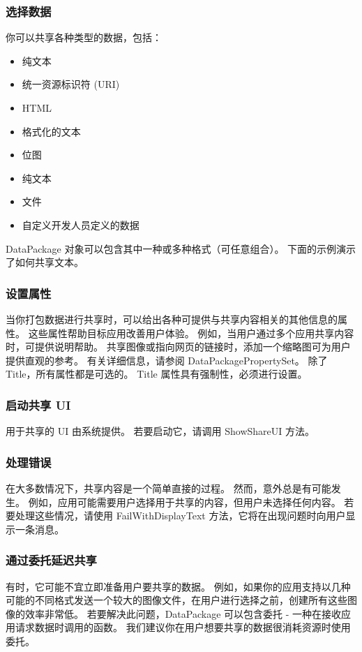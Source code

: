 \documentclass{book}
\begin{document}
	 \subsubsection{选择数据}
	 你可以共享各种类型的数据，包括：
	 \begin{itemize}
	 	\item 纯文本
	 	\item 统一资源标识符 (URI)
		\item HTML
		\item 格式化的文本
		\item 位图
		\item 纯文本
		\item 文件
		\item 自定义开发人员定义的数据
	 \end{itemize}
	 DataPackage 对象可以包含其中一种或多种格式（可任意组合）。 下面的示例演示了如何共享文本。
	 
	 \subsubsection{设置属性}
	 当你打包数据进行共享时，可以给出各种可提供与共享内容相关的其他信息的属性。 这些属性帮助目标应用改善用户体验。 例如，当用户通过多个应用共享内容时，可提供说明帮助。 共享图像或指向网页的链接时，添加一个缩略图可为用户提供直观的参考。 有关详细信息，请参阅 DataPackagePropertySet。
	 除了 Title，所有属性都是可选的。 Title 属性具有强制性，必须进行设置。
	 
	 \subsubsection{启动共享 UI}
	 用于共享的 UI 由系统提供。 若要启动它，请调用 ShowShareUI 方法。
	 
	 \subsubsection{处理错误}
	 在大多数情况下，共享内容是一个简单直接的过程。 然而，意外总是有可能发生。 例如，应用可能需要用户选择用于共享的内容，但用户未选择任何内容。 若要处理这些情况，请使用 FailWithDisplayText 方法，它将在出现问题时向用户显示一条消息。
	 \subsubsection{通过委托延迟共享}
	 有时，它可能不宜立即准备用户要共享的数据。 例如，如果你的应用支持以几种可能的不同格式发送一个较大的图像文件，在用户进行选择之前，创建所有这些图像的效率非常低。
	 若要解决此问题，DataPackage 可以包含委托 - 一种在接收应用请求数据时调用的函数。 我们建议你在用户想要共享的数据很消耗资源时使用委托。
	 
\end{document}
